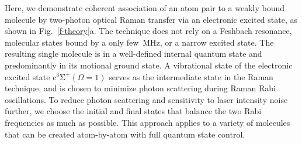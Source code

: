 \documentclass[aps,prl,twocolumn,10pt,superscriptaddress]{revtex4-1}
\begin{document}
Here, we demonstrate coherent association of an atom pair to a weakly bound molecule
by two-photon optical Raman transfer via an electronic excited state,
as shown in Fig.~\ref{f-theory}a.
The technique does not rely on a Feshbach resonance,
molecular states bound by a only few~MHz, or a narrow excited state.
The resulting single molecule is in a well-defined internal quantum state
and predominantly in its motional ground state.
A vibrational state of the electronic excited state $\mathrm{c^3\Sigma^+}(\Omega = 1)$
serves as the intermediate state in the Raman technique,
and is chosen to minimize photon scattering during Raman Rabi oscillations.
To reduce photon scattering and sensitivity to laser intensity noise further,
we choose the initial and final states that balance the two Rabi frequencies as much as possible.
This approach applies to a variety of molecules that can be created atom-by-atom with full quantum state control.
\end{document}
